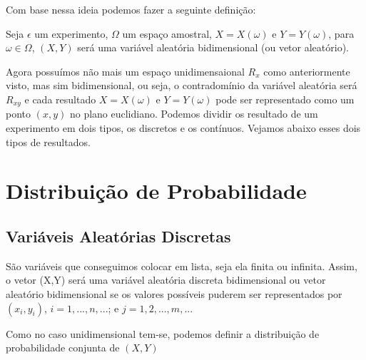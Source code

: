 \documentclass[
  letterpaper,
  DIV=11,
  numbers=noendperiod]{scrreprt}
\begin{document}
Com base nessa ideia podemos fazer a seguinte definição:

\begin{tcolorbox}[enhanced jigsaw, bottomrule=.15mm, colbacktitle=quarto-callout-note-color!10!white, colback=white, toptitle=1mm, colframe=quarto-callout-note-color-frame, breakable, arc=.35mm, opacitybacktitle=0.6, titlerule=0mm, title={DEFINIÇÃO}, left=2mm, bottomtitle=1mm, coltitle=black, rightrule=.15mm, leftrule=.75mm, toprule=.15mm, opacityback=0]

Seja \(\epsilon\) um experimento, \(\Omega\) um espaço amostral,
\(X = X(\omega)\) e \(Y = Y(\omega)\), para \(\omega \in \Omega\),
\((X,Y)\) será uma variável aleatória bidimensional (ou vetor
aleatório).

\end{tcolorbox}

Agora possuímos não mais um espaço unidimensaional \(R_{x}\) como
anteriormente visto, mas sim bidimensional, ou seja, o contradomínio da
variável aleatória será \(R_{xy}\) e cada resultado \(X = X(\omega)\) e
\(Y = Y(\omega)\) pode ser representado como um ponto \((x,y)\) no plano
euclidiano. Podemos dividir os resultado de um experimento em dois
tipos, os discretos e os contínuos. Vejamos abaixo esses dois tipos de
resultados.

\section{Distribuição de
Probabilidade}\label{distribuiuxe7uxe3o-de-probabilidade}

\subsection{Variáveis Aleatórias
Discretas}\label{variuxe1veis-aleatuxf3rias-discretas}

São variáveis que conseguimos colocar em lista, seja ela finita ou
infinita. Assim, o vetor (X,Y) será uma variável aleatória discreta
bidimensional ou vetor aleatório bidimensional se os valores possíveis
puderem ser representados por \((x_{i},y_{i})\), \(i=1,...,n,...\); e
\(j=1,2,...,m,...\)

Como no caso unidimensional tem-se, podemos definir a distribuição de
probabilidade conjunta de \((X,Y)\)
\end{document}
